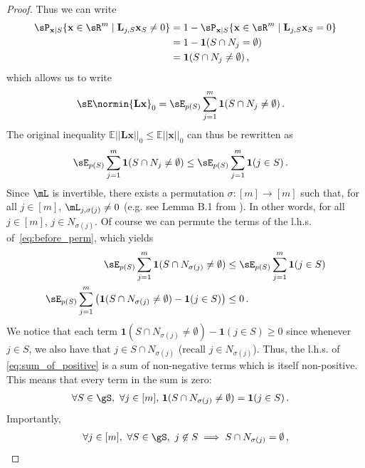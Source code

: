 \documentclass{article}
\newcommand{\x}{\mathbf{x}}
\begin{document}
\begin{proof}
Thus we can write
\begin{align}
    \sP_{\x \mid S}\{ \x \in \sR^m \mid \mathbf{L}_{j, S}\x_S \not= 0\} &= 1 - \sP_{\x \mid S}\{ \x \in \sR^m \mid \mathbf{L}_{j, S}\x_S = 0\}\\
    &= 1 - \mathbf{1}(S \cap N_j = \emptyset) \\
    &= \mathbf{1}(S \cap N_j \not= \emptyset)\,,
\end{align}
which allows us to write
\begin{align}
    \sE\normin{\mathbf{L}\x}_{0} &= \sE_{p(S)}\sum_{j=1}^m \mathbf{1}(S \cap N_j \not= \emptyset)\,.
\end{align}
The original inequality $\mathbb{E}||\mathbf{L}\x||_0 \leq \mathbb{E}||\x||_0$ can thus be rewritten as
\begin{align}
    \sE_{p(S)}\sum_{j=1}^m \mathbf{1}(S \cap N_j \not= \emptyset) &\leq \sE_{p(S)}\sum_{j=1}^m \mathbf{1}(j \in S) \,. \label{eq:before_perm}
\end{align}
Since $\mL$ is invertible, there exists a permutation $\sigma: [m] \rightarrow [m]$ such that, for all $j \in [m]$, $\mL_{j, \sigma(j)} \not=0$ (e.g. see Lemma B.1 from \citet{lachapelle2023synergies}). In other words, for all $j \in [m]$, $j \in N_{\sigma(j)}$. Of course we can permute the terms of the l.h.s. of~\cref{eq:before_perm}, which yields
\begin{align}
    \sE_{p(S)}\sum_{j=1}^m \mathbf{1}(S \cap N_{\sigma(j)} \not= \emptyset) &\leq \sE_{p(S)}\sum_{j=1}^m \mathbf{1}(j \in S)\\
    \sE_{p(S)}\sum_{j=1}^m \left(\mathbf{1}(S \cap N_{\sigma(j)} \not= \emptyset) - \mathbf{1}(j \in S)\right) &\leq 0 \,. \label{eq:sum_of_positive}
\end{align}
We notice that each term $\mathbf{1}(S \cap N_{\sigma(j)} \not= \emptyset) - \mathbf{1}(j \in S) \geq 0$ since whenever $j \in S$, we also have that $j \in S \cap N_{\sigma(j)}$ (recall $j \in N_{\sigma(j)}$). Thus, the l.h.s. of \cref{eq:sum_of_positive} is a sum of non-negative terms which is itself non-positive. This means that every term in the sum is zero:
\begin{align}
    \forall S \in \gS,\ \forall j \in [m],&\ \mathbf{1}(S \cap N_{\sigma(j)} \not= \emptyset) = \mathbf{1}(j \in S)\,.
\end{align}
Importantly,
\begin{align}
    \forall j \in [m],\ \forall S \in \gS,\ j \not\in S \implies S \cap N_{\sigma(j)} = \emptyset\,,
\end{align}

\end{proof}
\end{document}

